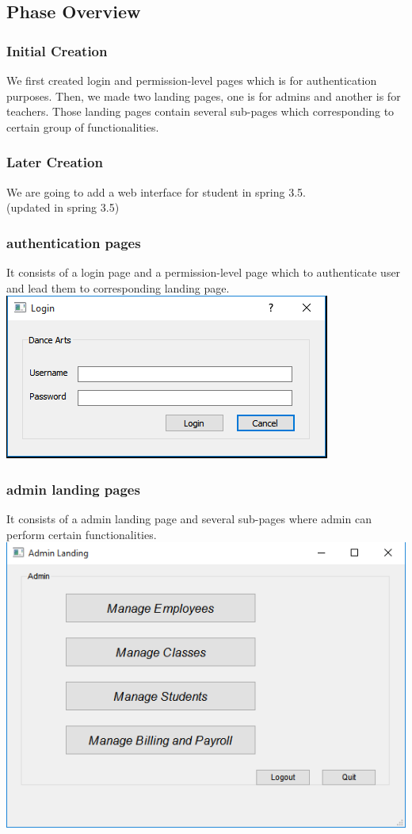 \subsection{Phase Overview}
\subsubsection{Initial Creation}
We first created login and permission-level pages which is for authentication purposes. Then, we made two landing pages, one is for admins and another is for teachers. Those landing pages contain several sub-pages which corresponding to certain group of functionalities.
\subsubsection{Later Creation}
We are going to add a web interface for student in spring 3.5.\\
(updated in spring 3.5)\\
 
\subsubsection{authentication pages}
It consists of a login page and a permission-level page which to authenticate user and lead them to corresponding landing page.\\
\includegraphics[scale=0.7]{pics/login_page.png}
\subsubsection{admin landing pages} 
It consists of a admin landing page and several sub-pages where admin can perform certain functionalities.\\
\includegraphics[scale=0.7]{pics/admin_landing.png}

